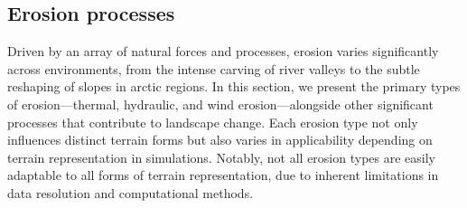 









\subsection{Erosion processes}
Driven by an array of natural forces and processes, erosion varies significantly across environments, from the intense carving of river valleys to the subtle reshaping of slopes in arctic regions. In this section, we present the primary types of erosion—thermal, hydraulic, and wind erosion—alongside other significant processes that contribute to landscape change. 
Each erosion type not only influences distinct terrain forms but also varies in applicability depending on terrain representation in simulations. Notably, not all erosion types are easily adaptable to all forms of terrain representation, due to inherent limitations in data resolution and computational methods.


